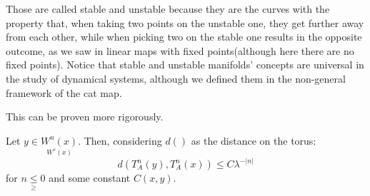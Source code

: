 Those are called stable and unstable because they are the curves with the property that, when taking two points on the unstable one, they get further away from each other, while when picking two on the stable one results in the opposite outcome, as we saw in linear maps with fixed points(although here there are no fixed points). Notice that stable and unstable manifolds' concepts are universal in the study of dynamical systems, although we defined them in the non-general framework of the cat map.

This can be proven more rigorously.

\begin{proposition}
    Let $y\in \underset{W^{s}(x)}{W^{u}(x)}$. Then, considering $d()$ as the distance on the torus: \begin{equation*}
    d(T_A^n(y), T_A^n(x))\leq C\lambda^{-|n|}
    \end{equation*} for $n\underset{\geq}{\leq} 0$ and some constant $C(x, y)$. 
\end{proposition}
